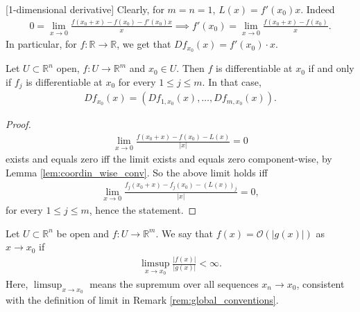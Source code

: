 \begin{remark}\label{rem:1d-derivative}[1-dimensional derivative]
	Clearly, for $m=n=1$, $L(x)=f'(x_{0})x$. Indeed
	\begin{align*}
		0 = \lim_{x \to 0} \frac{f(x_{0} + x) - f(x_{0}) - f'(x_{0})x}{x} \implies f'(x_{0}) = \lim_{x \to 0} \frac{f(x_{0}+x)-f(x_{0})}{x}.
	\end{align*}
	In particular, for $f: \mathbb{R} \to \mathbb{R}$, we get that $Df_{x_{0}}(x) = f'(x_{0}) \cdot x$.
\end{remark}

\begin{lemma}\label{lem:differential_component_wise}
	Let $U \subset \mathbb{R}^{n}$ open, $f: U \to \mathbb{R}^{m}$ and $x_{0} \in U$. Then $f$ is differentiable at $x_{0}$ if and only if $f_{j}$ is differentiable at $x_{0}$ for every $1 \leq j \leq m$. In that case,
	\begin{align*}
		Df_{x_{0}}(x) = (Df_{1,x_{0}}(x), \dots, Df_{m,x_{0}}(x)).
	\end{align*}
\end{lemma}
\begin{proof}
	\begin{align*}
		\lim_{x \to 0}\frac{f(x_{0}+x)-f(x_{0})-L(x)}{\left| x \right| } = 0
	\end{align*}
	exists and equals zero iff the limit exists and equals zero component-wise, by Lemma \ref{lem:coordin_wise_conv}. So the above limit holds iff
	\begin{align*}
		\lim_{x \to 0} \frac{f_{j}(x_{0}+x)-f_{j}(x_{0})-(L(x))_{j}}{\left| x \right|} = 0,
	\end{align*}
	for every $1 \leq j \leq m$, hence the statement.
\end{proof}

\begin{definition}\label{def:bigO-notation}
	Let $U \subset \mathbb{R}^{n}$ be open and $f: U \to \mathbb{R}^{m}$. We say that $f(x) = \mathcal{O}(\left| g(x) \right|)$ as $x \to x_{0}$ if
	\begin{align*}
		\limsup_{x \to x_{0}} \frac{\left| f(x) \right| }{\left| g(x) \right| } < \infty.
	\end{align*}
	Here, $\limsup_{x \to x_{0}} $ means the supremum over all sequences $x_{n} \to x_{0}$, consistent with the definition of limit in Remark \ref{rem:global_conventions}.
\end{definition}

